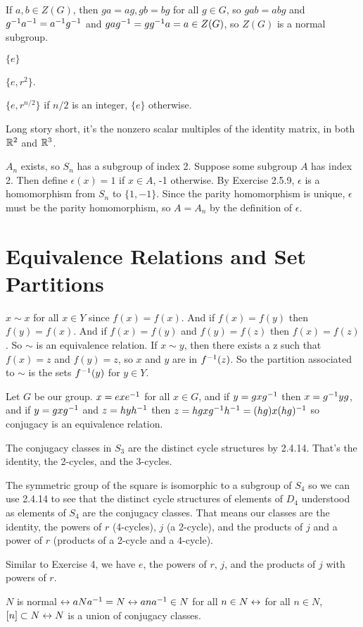 \documentclass[11pt, oneside]{article}   	%
\begin{document}
\item If $a, b \in Z(G)$, then $ga = ag, gb = bg$ for all $g \in G$, so $gab = abg$ and $g^{-1} a^{-1} = a^{-1} g^{-1}$ and $gag^{-1} = gg^{-1} a = a \in Z(G)$, so $Z(G)$ is a normal subgroup. 
\item $\{e\}$
\ee
\item \be
\item $\{e, r^2\}$.
\item $\{e, r^{n/2}\}$ if $n/2$ is an integer, $\{e\}$ otherwise.
\ee
\item Long story short, it's the nonzero scalar multiples of the identity matrix, in both $\mathbb{R}^2$ and $\mathbb{R}^3$.
\item $A_n$ exists, so $S_n$ has a subgroup of index 2. Suppose some subgroup $A$ has index 2. Then define $\epsilon(x) = 1$ if $x \in A$, -1 otherwise. By Exercise 2.5.9, $\epsilon$ is a homomorphism from $S_n$ to $\{1, -1\}$. Since the parity homomorphism is unique, $\epsilon$ must be the parity homomorphism, so $A = A_n$ by the definition of $\epsilon$.
\ee
\section{Equivalence Relations and Set Partitions}
\be
\item $x \sim x$ for all $x \in Y$ since $f(x) = f(x)$. And if $f(x) = f(y)$ then $f(y) = f(x)$. And if $f(x) = f(y)$ and $f(y) = f(z)$ then $f(x) = f(z)$. So $\sim$ is an equivalence relation. If $x \sim y$, then there exists a z such that $f(x) = z$ and $f(y) = z$, so $x$ and $y$ are in $f^{-1}(z)$. So the partition associated to $\sim$ is the sets $f^{-1}(y)$ for $y \in Y$.
\item Let $G$ be our group. $x = exe^{-1}$ for all $x\in G$, and if $y = gxg^{-1}$ then $x = g^{-1} yg$, and if $y = gxg^{-1}$ and $z = hyh^{-1}$ then $z = hgxg^{-1} h^{-1} = (hg)x(hg)^{-1}$ so conjugacy is an equivalence relation.
\item The conjugacy classes in $S_3$ are the distinct cycle structures by 2.4.14. That's the identity, the 2-cycles, and the 3-cycles.
\item The symmetric group of the square is isomorphic to a subgroup of $S_4$ so we can use 2.4.14 to see that the distinct cycle structures of elements of $D_4$ understood as elements of $S_4$ are the conjugacy classes. That means our classes are the identity, the powers of $r$ (4-cycles), $j$ (a 2-cycle), and the products of $j$ and a power of $r$ (products of a 2-cycle and a 4-cycle).
\item Similar to Exercise 4, we have $e$, the powers of $r$, $j$, and the products of $j$ with powers of $r$.
\item $N$ is normal $\leftrightarrow aNa^{-1} = N \leftrightarrow ana^{-1} \in N$ for all $n \in N \leftrightarrow $ for all $n \in N$, $[n] \subset N \leftrightarrow N$ is a union of conjugacy classes.
\ee
\end{document}
